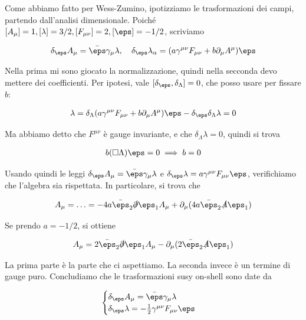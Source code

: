 \documentclass{report}
\begin{document}
Come abbiamo fatto per Wess-Zumino, ipotizziamo le trasformazioni dei campi, partendo dall'analisi dimensionale. Poiché \([A_\mu] = 1, [\lambda] = 3/2, [F_{\mu\nu}] = 2, [\eps] = -1/2\), scriviamo 

\begin{align}
    \delta_\eps A_\mu = \bar{\eps}\gamma_\mu \lambda, \quad \delta_\eps \lambda_\alpha = (a\gamma^{\mu\nu}F_{\mu\nu} + b\partial_\mu A^\mu)\eps
\end{align}

Nella prima mi sono giocato la normalizzazione, quindi nella secconda devo mettere dei coefficienti. Per ipotesi, vale \([\delta_\eps, \delta_\Lambda] = 0\), che posso usare per fissare \(b\): 

\begin{align}
    [\delta_\eps, \delta_\Lambda]\lambda = \delta_\Lambda(a\gamma^{\mu\nu}F_{\mu\nu} + b\partial_\mu A^\mu)\eps - \delta_\eps\delta_\Lambda \lambda = 0 
\end{align}

Ma abbiamo detto che \(F^{\mu\nu}\) è gauge invariante, e che \(\delta_\Lambda \lambda = 0\), quindi si trova 

\begin{align}
    b (\square \Lambda)\eps = 0 \implies b = 0 
\end{align}

Usando quindi le leggi \(\delta_\eps A_\mu = \bar{\eps}\gamma_\mu \lambda\) e \(\delta_\eps \lambda = a \gamma^{\mu\nu}F_{\mu\nu}\eps\), verifichiamo che l'algebra sia rispettata. In particolare, si trova che 

\begin{align}
    [\delta_{\eps_1}, \delta_{\eps_2}]A_\mu = \ldots = -4a \bar{\eps}_2 \slashed{\partial}\eps_1 A_\mu + \partial_\mu (4a\bar{\eps}_2 \slashed{A}\eps_1)
\end{align}

Se prendo \(a = -1/2\), si ottiene 

\begin{align}
    [\delta_{\eps_1}, \delta_{\eps_2}]A_\mu = 2 \bar{\eps}_2 \slashed{\partial}\eps_1 A_\mu - \partial_\mu (2\bar{\eps}_2 \slashed{A}\eps_1)
\end{align}

La prima parte è la parte che ci aspettiamo. La seconda invece è un termine di gauge puro. Concludiamo che le trasformazioni susy on-shell sono date da 

\begin{align}
    \begin{cases}
        \delta_\eps A_\mu = \bar{\eps}\gamma_\mu \lambda \\ 
        \delta_\eps \lambda = -\frac{1}{2}\gamma^{\mu\nu}F_{\mu\nu}\eps
    \end{cases}
\end{align}
\end{document}
